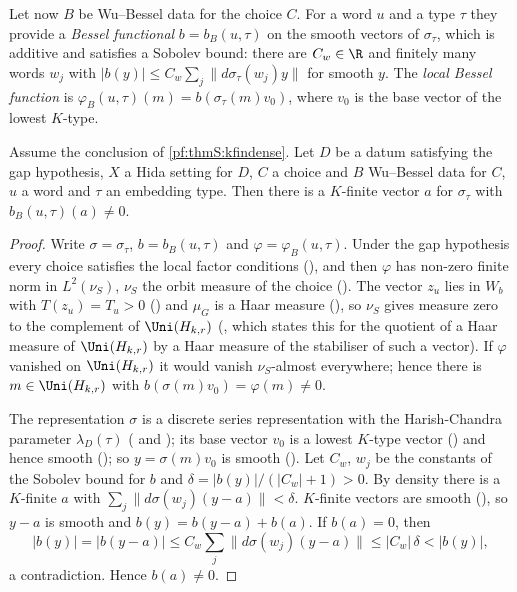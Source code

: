 Let now $B$ be Wu--Bessel data for the choice $C$. For a word $u$ and a type $\tau$ they provide a \emph{Bessel functional}
$b=b_B(u,\tau)$ on the smooth vectors of $\sigma_\tau$, which is additive and satisfies a Sobolev bound: there are $C_w\in\R$ and
finitely many words $w_j$ with $|b(y)|\le C_w\sum_j\|d\sigma_\tau(w_j)y\|$ for smooth $y$. The \emph{local Bessel function} is
$\varphi_B(u,\tau)(m)=b(\sigma_\tau(m)v_0)$, where $v_0$ is the base vector of the lowest $K$-type.

\begin{proposition}\label{pf:thmS:kfinnz}
Assume the conclusion of \cref{pf:thmS:kfindense}. Let $D$ be a datum satisfying the gap hypothesis, $X$ a Hida setting for $D$,
$C$ a choice and $B$ Wu--Bessel data for $C$, $u$ a word and $\tau$ an embedding type. Then there is a $K$-finite vector $a$ for
$\sigma_\tau$ with $b_B(u,\tau)(a)\ne0$.
\end{proposition}

\begin{proof}
Write $\sigma=\sigma_\tau$, $b=b_B(u,\tau)$ and $\varphi=\varphi_B(u,\tau)$. Under the gap hypothesis every choice satisfies the
local factor conditions (), and then $\varphi$ has non-zero finite norm in
$L^2(\nu_S)$, $\nu_S$ the orbit measure of the choice (). The
vector $z_u$ lies in $W_b$ with $T(z_u)=T_u>0$ () and $\mu_G$ is a Haar measure
(), so $\nu_S$ gives measure zero to the complement of $\Uni(H_{k,r})$
(, which states this for the quotient of a Haar measure of $\Uni(H_{k,r})$ by a Haar
measure of the stabiliser of such a vector). If $\varphi$ vanished on $\Uni(H_{k,r})$ it would vanish $\nu_S$-almost everywhere;
hence there is $m\in\Uni(H_{k,r})$ with $b(\sigma(m)v_0)=\varphi(m)\ne0$.

The representation $\sigma$ is a discrete series representation with the Harish-Chandra parameter $\lambda_D(\tau)$
( and ); its base vector $v_0$ is a lowest
$K$-type vector () and hence smooth
(); so $y=\sigma(m)v_0$ is smooth
(). Let $C_w$, $w_j$ be the constants of the Sobolev bound
for $b$ and $\delta=|b(y)|/(|C_w|+1)>0$. By density there is a $K$-finite $a$ with $\sum_j\|d\sigma(w_j)(y-a)\|<\delta$.
$K$-finite vectors are smooth (), so $y-a$ is smooth and $b(y)=b(y-a)+b(a)$. If
$b(a)=0$, then
\[
|b(y)|=|b(y-a)|\le C_w\sum_j\|d\sigma(w_j)(y-a)\|\le|C_w|\,\delta<|b(y)|,
\]
a contradiction. Hence $b(a)\ne0$.
\end{proof}

